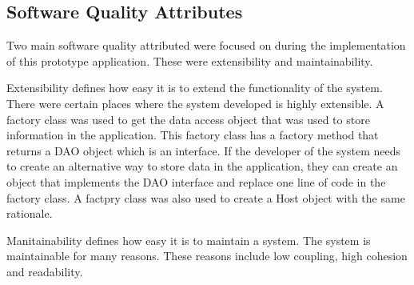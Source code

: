\tocless\subsection{Software Quality Attributes}
Two main software quality attributed were focused on during the implementation of this prototype application. These were extensibility and maintainability.

Extensibility defines how easy it is to extend the functionality of the system.
There were certain places where the system developed is highly extensible.
A factory class was used to get the data access object that was used to store information in the application.
This factory class has a factory method that returns a DAO object which is an interface.
If the developer of the system needs to create an alternative way to store data in the application, they can create an object that implements the DAO interface and replace one line of code in the factory class.
A factpry class was also used to create a Host object with the same rationale.

Manitainability defines how easy it is to maintain a system.
The system is maintainable for many reasons.
These reasons include low coupling, high cohesion and readability.





